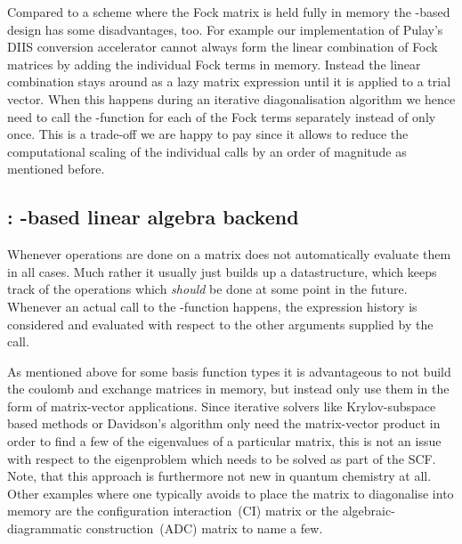 Compared to a scheme where the Fock matrix is held fully in memory
the \contraction-based design has some disadvantages, too.
For example our implementation of Pulay's DIIS conversion accelerator
cannot always form the linear combination of Fock matrices by adding the
individual Fock terms in memory.
Instead the linear combination stays around as a lazy matrix expression
until it is applied to a trial vector.
When this happens during an iterative diagonalisation algorithm
we hence need to call the \contraction-function for each of the
Fock terms separately instead of only once.
This is a trade-off we are happy to pay since it allows to
reduce the computational scaling of the individual \contraction
calls by an order of magnitude as mentioned before.

%
%
\subsection{\lazyten: \contraction-based linear algebra backend}
%
%

Whenever operations are done on a matrix \lazyten does not automatically
evaluate them in all cases.
Much rather it usually just builds up a datastructure,
which keeps track of the operations which \textit{should} be done
at some point in the future.
Whenever an actual call to the \contraction-function happens,
the expression history is considered and evaluated with respect
to the other arguments supplied by the \contraction call.


As mentioned above for some basis function types it is advantageous
to not build the coulomb and exchange matrices in memory,
but instead only use them in the form of matrix-vector applications.
Since iterative solvers like Krylov-subspace based methods or Davidson's algorithm
only need the matrix-vector product in order to find a few of the eigenvalues
of a particular matrix,
this is not an issue with respect to the eigenproblem which needs to be solved
as part of the SCF.
Note, that this approach is furthermore not new in quantum chemistry at all.
Other examples where one typically avoids to place the matrix to diagonalise
into memory are the configuration interaction~(CI) matrix
or the algebraic-diagrammatic construction~(ADC) matrix to name a few.

